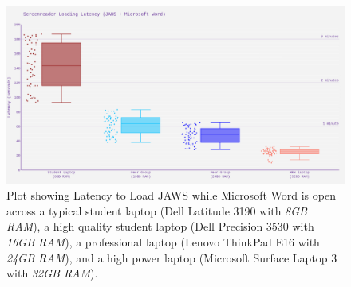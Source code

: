 \documentclass[14pt,letterpaper,twoside]{extreport}
\begin{document}
\begin{figure}[H]
	\centering
	\includegraphics[width=\textwidth]{images/ComputerRBDisplaySpecsTVIFig1.png}

	\caption[Latency to Load JAWS]{Plot showing Latency to Load JAWS while Microsoft Word is open across a typical student laptop (Dell Latitude 3190 with \textit{8GB RAM}), a high quality student laptop (Dell Precision 3530 with \textit{16GB RAM}), a professional laptop (Lenovo ThinkPad E16 with \textit{24GB RAM}), and a high power laptop (Microsoft Surface Laptop 3 with \textit{32GB RAM}).}\label{fig:figure 1}
\end{figure}
\end{document}

